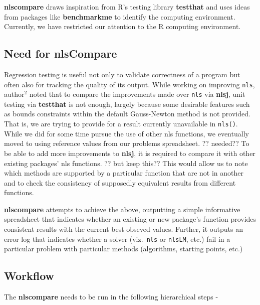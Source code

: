 \textbf{nlscompare} draws inspiration from R's testing library
\textbf{testthat} and uses ideas from packages like \textbf{benchmarkme}
to identify the computing environment. Currently, we have restricted our
attention to the R computing environment.

\hypertarget{need-for-nlscompare}{%
\subsection{Need for nlsCompare}\label{need-for-nlscompare}}

Regression testing is useful not only to validate correctness of a
program but often also for tracking the quality of its output. While
working on improving \texttt{nls}, author\(^2\) noted that to compare
the improvements made over \texttt{nls} via \textbf{nlsj}, unit testing
via \textbf{testthat} is not enough, largely because some desirable
features such as bounds constraints within the default Gauss-Newton
method is not provided. That is, we are trying to provide for a result
currently unavailable in \texttt{nls()}. While we did for some time
pursue the use of other nls functions, we eventually moved to using
reference values from our problems spreadsheet. ?? needed?? To be able
to add more improvements to \textbf{nlsj}, it is required to compare it
with other existing packages' nls functions. ?? but keep this?? This
would allow us to note which methods are supported by a particular
function that are not in another and to check the consistency of
supposedly equivalent results from different functions.

\textbf{nlscompare} attempts to achieve the above, outputting a simple
informative spreadsheet that indicates whether an existing or new
package's function provides consistent results with the current best
obseved values. Further, it outputs an error log that indicates whether
a solver (viz.~\texttt{nls} or \texttt{nlsLM}, etc.) fail in a
particular problem with particular methods (algorithms, starting points,
etc.)

\hypertarget{workflow}{%
\subsection{Workflow}\label{workflow}}

The \textbf{nlscompare} needs to be run in the following hierarchical
steps -

